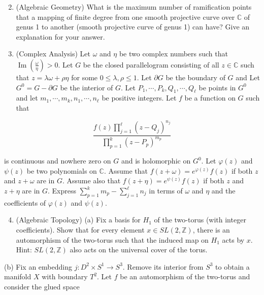 \documentclass[10pt]{article}
\begin{document}
\begin{enumerate}
  \setcounter{enumi}{1}
  \item (Algebraic Geometry) What is the maximum number of ramification points that a mapping of finite degree from one smooth projective curve over $\mathbb{C}$ of genus 1 to another (smooth projective curve of genus 1) can have? Give an explanation for your answer.

  \item (Complex Analysis) Let $\omega$ and $\eta$ be two complex numbers such that $\operatorname{Im}\left(\frac{\omega}{\eta}\right)>0$. Let $G$ be the closed parallelogram consisting of all $z \in \mathbb{C}$ such that $z=\lambda \omega+\rho \eta$ for some $0 \leq \lambda, \rho \leq 1$. Let $\partial G$ be the boundary of $G$ and Let $G^{0}=G-\partial G$ be the interior of $G$. Let $P_{1}, \cdots, P_{k}, Q_{1}, \cdots, Q_{\ell}$ be points in $G^{0}$ and let $m_{1}, \cdots, m_{k}, n_{1}, \cdots, n_{\ell}$ be positive integers. Let $f$ be a function on $G$ such that

\end{enumerate}

$$
\frac{f(z) \prod_{j=1}^{\ell}\left(z-Q_{j}\right)^{n_{j}}}{\prod_{p=1}^{k}\left(z-P_{p}\right)^{m_{p}}}
$$

is continuous and nowhere zero on $G$ and is holomorphic on $G^{0}$. Let $\varphi(z)$ and $\psi(z)$ be two polynomials on $\mathbb{C}$. Assume that $f(z+\omega)=e^{\varphi(z)} f(z)$ if both $z$ and $z+\omega$ are in $G$. Assume also that $f(z+\eta)=e^{\psi(z)} f(z)$ if both $z$ and $z+\eta$ are in $G$. Express $\sum_{p=1}^{k} m_{p}-\sum_{j=1}^{\ell} n_{j}$ in terms of $\omega$ and $\eta$ and the coefficients of $\varphi(z)$ and $\psi(z)$.

\begin{enumerate}
  \setcounter{enumi}{3}
  \item (Algebraic Topology) (a) Fix a basis for $H_{1}$ of the two-torus (with integer coefficients). Show that for every element $x \in S L(2, \mathbb{Z})$, there is an automorphism of the two-torus such that the induced map on $H_{1}$ acts by $x$. Hint: $S L(2, \mathbb{Z})$ also acts on the universal cover of the torus.
\end{enumerate}

(b) Fix an embedding $j: D^{2} \times S^{1} \rightarrow S^{3}$. Remove its interior from $S^{3}$ to obtain a manifold $X$ with boundary $T^{2}$. Let $f$ be an automorphism of the two-torus and consider the glued space
\end{document}
